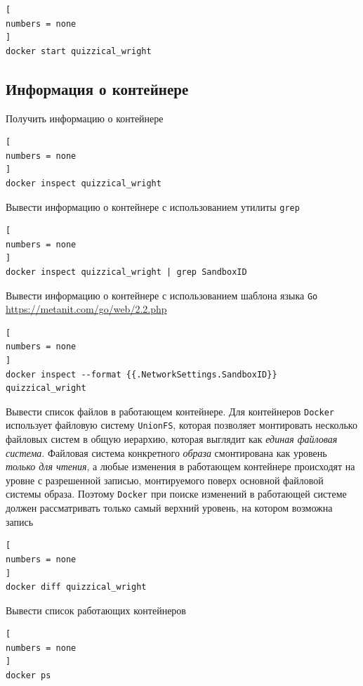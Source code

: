 \documentclass[%
	11pt,
	a4paper,
	utf8,
		]{article}
\begin{document}
\begin{lstlisting}[
numbers = none
]
docker start quizzical_wright
\end{lstlisting}

\subsection{Информация о контейнере}

Получить информацию о контейнере

\begin{lstlisting}[
numbers = none
]
docker inspect quizzical_wright
\end{lstlisting}

Вывести информацию о контейнере с использованием утилиты \texttt{grep}

\begin{lstlisting}[
numbers = none
]
docker inspect quizzical_wright | grep SandboxID
\end{lstlisting}

Вывести информацию о контейнере с использованием шаблона языка \texttt{Go} \url{https://metanit.com/go/web/2.2.php}

\begin{lstlisting}[
numbers = none
]
docker inspect --format {{.NetworkSettings.SandboxID}} quizzical_wright
\end{lstlisting}

Вывести список файлов в работающем контейнере. Для контейнеров \texttt{Docker} использует файловую систему \texttt{UnionFS}, которая позволяет монтировать несколько файловых систем в общую иерархию, которая выглядит как \emph{единая файловая система}. Файловая система конкретного \emph{образа} смонтирована как уровень \emph{только для чтения}, а любые изменения в работающем контейнере происходят на уровне с разрешенной записью, монтируемого поверх основной {файловой системы образа}. Поэтому \texttt{Docker} при поиске изменений в работающей системе должен рассматривать только самый верхний уровень, на котором возможна запись \cite{mouat:docker-2017}

\begin{lstlisting}[
numbers = none
]
docker diff quizzical_wright
\end{lstlisting}

Вывести список работающих контейнеров

\begin{lstlisting}[
numbers = none
]
docker ps
\end{lstlisting}
\end{document}
